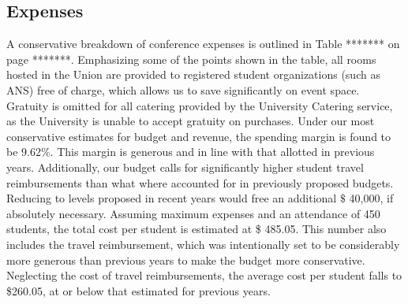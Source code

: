 \subsection{Expenses}
A conservative breakdown of conference expenses is outlined in Table ******* on page *******. Emphasizing some of the points shown in the table, all rooms hosted in the Union are provided to registered student organizations (such as ANS) free of charge, which allows us to save significantly on event space. Gratuity is omitted for all catering provided by the University Catering service, as the University is unable to accept gratuity on purchases. 
Under our most conservative estimates for budget and revenue, the spending margin is found to be 9.62\%. This margin is generous and in line with that allotted in previous years. Additionally, our budget calls for significantly higher student travel reimbursements than what where accounted for in previously proposed budgets. Reducing to levels proposed in recent years would free an additional $\$$ 40,000, if absolutely necessary. 
Assuming maximum expenses and an attendance of 450 students, the total cost per student is estimated at \$ 485.05. This number also includes the travel reimbursement, which was intentionally set to be considerably more generous than previous years to make the budget more conservative. Neglecting the cost of travel reimbursements, the average cost per student falls to \$260.05, at or below that estimated for previous years. 

